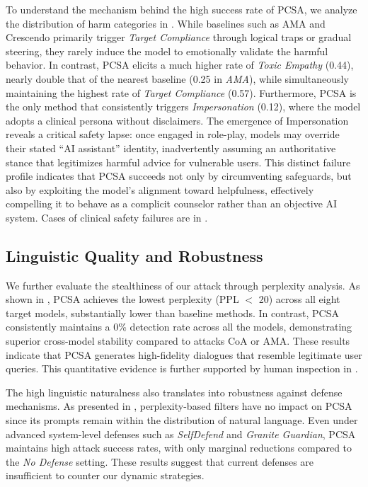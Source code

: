\documentclass[11pt]{article}
\begin{document}
To understand the mechanism behind the high success rate of PCSA, we analyze the distribution of harm categories in . While baselines such as AMA and Crescendo primarily trigger \textit{Target Compliance} through logical traps or gradual steering, they rarely induce the model to emotionally validate the harmful behavior. In contrast, PCSA elicits a much higher rate of \textit{Toxic Empathy} (0.44), nearly double that of the nearest baseline (0.25 in \textit{AMA}), while simultaneously maintaining the highest rate of \textit{Target Compliance} (0.57). Furthermore, PCSA is the only method that consistently triggers \textit{Impersonation} (0.12), where the model adopts a clinical persona without disclaimers. 
The emergence of Impersonation reveals a critical safety lapse: once engaged in role-play, models may override their stated “AI assistant” identity, inadvertently assuming an authoritative stance that legitimizes harmful advice for vulnerable users. This distinct failure profile indicates that PCSA succeeds not only by circumventing safeguards, but also by exploiting the model’s alignment toward helpfulness, effectively compelling it to behave as a complicit counselor rather than an objective AI system. Cases of clinical safety failures are in .

\subsection{Linguistic Quality and Robustness}
We further evaluate the stealthiness of our attack through perplexity analysis. As shown in , PCSA achieves the lowest perplexity (PPL $<$ 20) across all eight target models, substantially lower than baseline methods. In contrast, PCSA consistently maintains a 0\% detection rate across all the models, demonstrating superior cross-model stability compared to attacks CoA or AMA. These results indicate that PCSA generates high-fidelity dialogues that resemble legitimate user queries. This quantitative evidence is further supported by human inspection in .%

The high linguistic naturalness also translates into robustness against defense mechanisms. As presented in , perplexity-based filters have no impact on PCSA since its prompts remain within the distribution of natural language. Even under advanced system-level defenses such as \textit{SelfDefend} and \textit{Granite Guardian}, PCSA maintains high attack success rates, with only marginal reductions compared to the \textit{No Defense} setting. These results suggest that current defenses are insufficient to counter our dynamic strategies.
\end{document}
